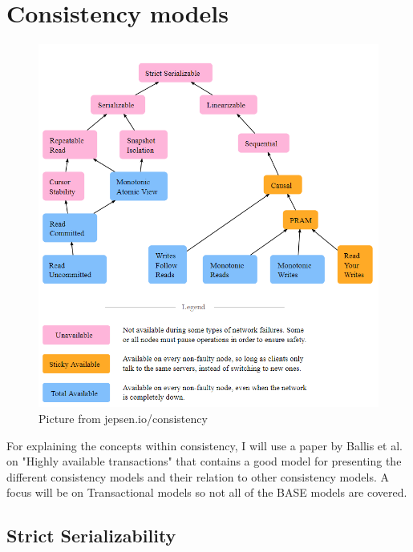 \documentclass[a4paper,10pt,titlepage]{report}
\begin{document}
    \newpage


    \section{Consistency models}


    \begin{figure}
        \centering
        \includegraphics[scale=0.4]{images/consistency models.PNG}
        \caption{Picture from jepsen.io/consistency}
        \label{fig:jepsenioconsistency}
    \end{figure}

    For explaining the concepts within consistency, I will use a paper by Ballis et al. on "Highly available transactions"\cite{HighlyAvailableTransactionsVirtuesandLimitations} that contains a good model for presenting the different consistency models and their relation to other consistency models. A focus will be on Transactional models so not all of the BASE models are covered.\\

    \subsection{Strict Serializability}
\end{document}
